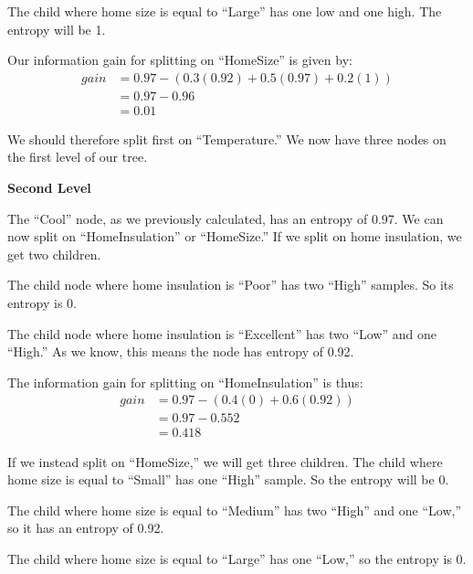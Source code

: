 \documentclass{article}
\begin{document}
\begin{enumerate}
\begin{enumerate}
                The child where home size is equal to ``Large'' has one low and
                one high. The entropy will be 1.

                Our information gain for splitting on ``HomeSize'' is given by:
                \begin{align*}
                    gain &= 0.97 - \left(0.3(0.92) + 0.5(0.97) + 0.2(1)\right) \\
                    & = 0.97 - 0.96 \\
                    & = 0.01
                \end{align*}

                We should therefore split first on ``Temperature.'' We now have
                three nodes on the first level of our tree.

                \textbf{Second Level}

                The ``Cool'' node, as we previously calculated, has an entropy
                of 0.97. We can now split on ``HomeInsulation'' or
                ``HomeSize.'' If we split on home insulation, we get two
                children.

                The child node where home insulation is ``Poor'' has two
                ``High'' samples. So its entropy is 0.

                The child node where home insulation is ``Excellent'' has two
                ``Low'' and one ``High.'' As we know, this means the node has
                entropy of 0.92.

                The information gain for splitting on ``HomeInsulation'' is
                thus:
                \begin{align*}
                    gain &= 0.97 - \left(0.4(0) + 0.6(0.92)\right) \\
                    &= 0.97 - 0.552 \\
                    &= 0.418
                \end{align*}

                If we instead split on ``HomeSize,'' we will get three
                children. The child where home size is equal to ``Small'' has
                one ``High'' sample. So the entropy will be 0.

                The child where home size is equal to ``Medium'' has two
                ``High'' and one ``Low,'' so it has an entropy of 0.92.

                The child where home size is equal to ``Large'' has one
                ``Low,'' so the entropy is 0.


\end{enumerate}
\end{enumerate}
\end{document}

